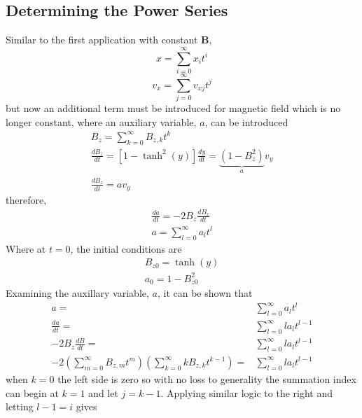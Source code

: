 \documentclass{article}
\begin{document}
\subsection{Determining the Power Series}
Similar to the first application with constant $\mathbf{B}$,
    \begin{equation}    
        x=\sum_{i=0}^\infty x_it^i 
    \end{equation}
    \begin{equation}
        v_x=\sum_{j=0}^\infty v_{xj}t^j    
    \end{equation}
but now an additional term must be introduced for magnetic field which is no longer constant, where an auxiliary variable, $a$, can be introduced
    \begin{gather}\label{equation: Hyper Bz Basic}
        B_z=\sum_{k=0}^\infty B_{z,k}t^k\\
        \frac{dB_z}{dt}=[1-\tanh^2(y)]\frac{dy}{dt}=\underbrace{(1-B_z^2)}_a v_y\\
        \frac{dB_z}{dt}=av_y
    \end{gather}       
therefore,
    \begin{gather}
        \frac{da}{dt}=-2B_z\frac{dB_z}{dt}\\
        a=\sum_{l=0}^\infty a_lt^l
    \end{gather}
Where at $t=0$, the initial conditions are
    \begin{equation}
        \begin{split}
            B_{z0}=\tanh(y)\\
            a_0=1-B_{z0}^2
        \end{split}
    \end{equation}
Examining the auxillary variable, $a$, it can be shown that
    \begin{equation}
        \begin{split}
            a=&\sum_{l=0}^\infty a_lt^l\\
            \frac{da}{dt}=&\sum_{l=0}^\infty la_lt^{l-1}\\
            -2B_z\frac{dB}{dt}=&\sum_{l=0}^\infty la_lt^{l-1}\\
            -2\left(\sum_{m=0}^\infty B_{z,m}t^m\right)\left(\sum_{k=0}^\infty kB_{z,k}t^{k-1}\right)=&\sum_{l=0}^\infty la_lt^{l-1}
            \end{split}
    \end{equation}
when $k=0$ the left side is zero so with no loss to generality the summation index can begin at $k=1$ and let $j=k-1$. Applying similar logic to the right and letting $l-1=i$ gives            
\end{document}
